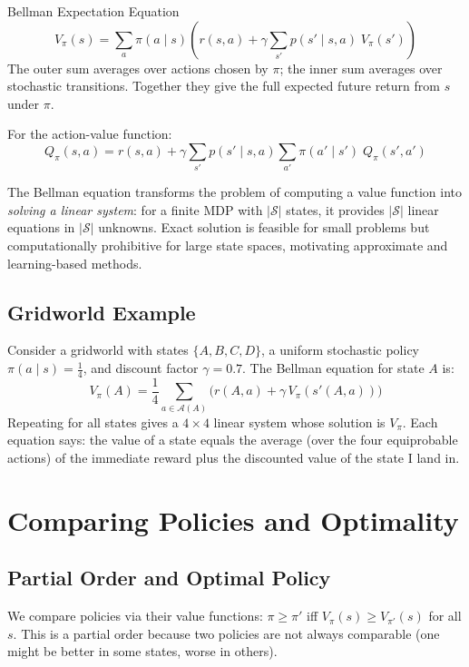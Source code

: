 \documentclass[11pt,a4paper]{article}
\begin{document}
\begin{thmbox}{Bellman Expectation Equation}
\[
V_\pi(s) = \sum_{a} \pi(a \mid s) \left( r(s,a) + \gamma \sum_{s'} p(s' \mid s,a)\; V_\pi(s') \right)
\]
The outer sum averages over actions chosen by $\pi$; the inner sum averages over stochastic transitions. Together they give the full expected future return from $s$ under $\pi$.
\end{thmbox}

For the action-value function:
\[
Q_\pi(s,a) = r(s,a) + \gamma \sum_{s'} p(s'\mid s,a) \sum_{a'} \pi(a'\mid s')\; Q_\pi(s',a')
\]

The Bellman equation transforms the problem of computing a value function into \emph{solving a linear system}: for a finite MDP with $|\mathcal{S}|$ states, it provides $|\mathcal{S}|$ linear equations in $|\mathcal{S}|$ unknowns. Exact solution is feasible for small problems but computationally prohibitive for large state spaces, motivating approximate and learning-based methods.

\subsection{Gridworld Example}

Consider a gridworld with states $\{A, B, C, D\}$, a uniform stochastic policy $\pi(a\mid s) = \frac{1}{4}$, and discount factor $\gamma = 0.7$. The Bellman equation for state $A$ is:
\[
V_\pi(A) = \frac{1}{4} \sum_{a \in \mathcal{A}(A)} \!\bigl( r(A,a) + \gamma\, V_\pi(s'(A,a)) \bigr)
\]
Repeating for all states gives a $4 \times 4$ linear system whose solution is $V_\pi$. Each equation says: the value of a state equals the average (over the four equiprobable actions) of the immediate reward plus the discounted value of the state I land in.

\section{Comparing Policies and Optimality}

\subsection{Partial Order and Optimal Policy}

We compare policies via their value functions: $\pi \geq \pi'$ iff $V_\pi(s) \geq V_{\pi'}(s)$ for all $s$. This is a partial order because two policies are not always comparable (one might be better in some states, worse in others).
\end{document}
